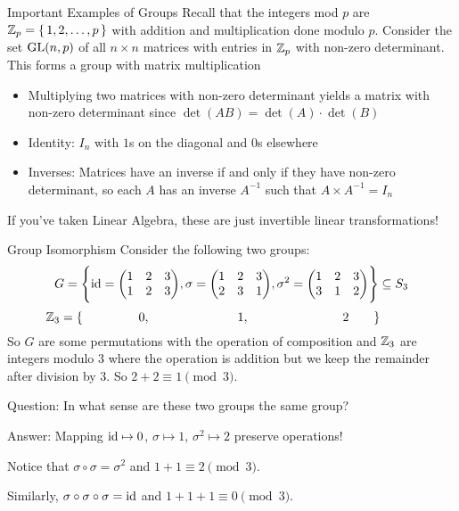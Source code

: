 \documentclass[aspectratio=169]{beamer}
\begin{document}
\begin{frame}{Important Examples of Groups}
    Recall that the integers mod $p$ are $ \mathbb{Z}_{p} = \set{1, 2, \ldots, p}$ with addition and multiplication done modulo $p$.
    Consider the set $\operatorname{GL}(n, p)$ of all $n \times n$ matrices with entries in $\mathbb{Z}_p$ with non-zero determinant. 
    This forms a group with matrix multiplication \pause
    \begin{itemize}
        \item Multiplying two matrices with non-zero determinant yields a matrix with non-zero determinant since $\det(AB) = \det(A) \cdot \det(B)$
        \item Identity: \pause $I_n$ with $1$s on the diagonal and $0$s elsewhere
        \item Inverses: \pause Matrices have an inverse if and only if they have non-zero determinant, so each $A$ has an inverse $A^{-1}$ such that $A \times A^{-1} = I_n$
    \end{itemize}
    If you've taken Linear Algebra, these are just invertible linear transformations!
\end{frame}

\begin{frame}{Group Isomorphism}
    Consider the following two groups:
    \[
       G = \Bigg\{  { \operatorname{id} = \begin{pmatrix} 1 & 2 & 3 \\ 1 & 2 & 3 \end{pmatrix}}, \sigma =  {\begin{pmatrix} 1 & 2 & 3 \\ 2 & 3 & 1 \end{pmatrix}},  { \sigma^2 = \begin{pmatrix} 1 & 2 & 3 \\ 3 & 1 & 2 \end{pmatrix}}  \Bigg\}  \subseteq S_3
    \]
    \[
     \hspace{-30pt}  \Z_3 = \{ \hspace{45pt} 0, \hspace{70pt} 1, \hspace{75pt} 2 \hspace{20pt} \}  
    \]
    So $G$ are some permutations with the operation of composition and $\mathbb{Z}_3$ are integers modulo $3$ where the operation is addition but we keep the remainder after division by $3$. So $2 + 2 \equiv 1 \pmod{3}$.
    
    \textcolor{sigma@alertred}{Question:} In what sense are these two groups the same group? \pause

    \textcolor{sigma@mainblue}{Answer:} Mapping $\operatorname{id} \mapsto 0$, $\sigma \mapsto 1$, $\sigma^2 \mapsto 2$ preserve operations! \pause
    
    Notice that $\sigma \circ \sigma = \sigma^2$ and $1 + 1 \equiv 2 \pmod{3}$. \pause
    
    Similarly, $\sigma \circ \sigma \circ \sigma = \operatorname{id}$ and $1 + 1 + 1 \equiv 0 \pmod{3}$.
\end{frame}
\end{document}
